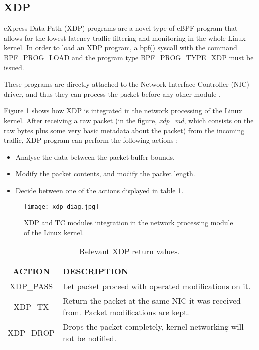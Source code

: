 \subsection{XDP} \label{subsection:xdp}
eXpress Data Path (XDP) programs are a novel type of eBPF program that allows for the lowest-latency traffic filtering and monitoring in the whole Linux kernel. In order to load an XDP program, a bpf() syscall with the command BPF\_PROG\_LOAD and the program type BPF\_PROG\_TYPE\_XDP must be issued. 

These programs are directly attached to the Network Interface Controller (NIC) driver, and thus they can process the packet before any other module \cite{xdp_gentle_intro}.

Figure \ref{fig:xdp_diag} shows how XDP is integrated in the network processing of the Linux kernel. After receiving a raw packet (in the figure, \textit{xdp\_md}, which consists on the raw bytes plus some very basic metadata about the packet) from the incoming traffic, XDP program can perform the following actions \cite{xdp_manual}:
\begin{itemize}
\item Analyse the data between the packet buffer bounds.
\item Modify the packet contents, and modify the packet length.
\item Decide between one of the actions displayed in table \ref{table:xdp_actions_av}.
\end{itemize}

\begin{figure}[htbp]
	\centering
	\texttt{[image: xdp\_diag.jpg]}
	\caption{XDP and TC modules integration in the network processing module of the Linux kernel.}
	\label{fig:xdp_diag}
\end{figure}

\begin{table}[htbp]
\begin{tabular}{|c|>{\centering\arraybackslash}p{10cm}|}
\hline
ACTION & DESCRIPTION\\
\hline
\hline
XDP\_PASS & Let packet proceed with operated modifications on it.\\
\hline
XDP\_TX & Return the packet at the same NIC it was received from. Packet modifications are kept.\\
\hline
XDP\_DROP & Drops the packet completely, kernel networking will not be notified.\\
\hline
\end{tabular}
\caption{Relevant XDP return values.}
\label{table:xdp_actions_av}
\end{table}

